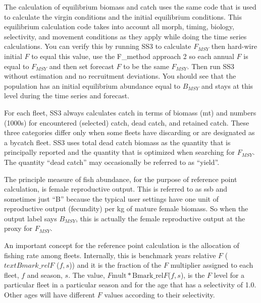 The calculation of equilibrium biomass and catch uses the same code that is used to calculate the virgin conditions and the initial equilibrium conditions. This equilibrium calculation code takes into account all morph, timing, biology, selectivity, and movement conditions as they apply while doing the time series calculations. You can verify this by running SS3 to calculate $F_{MSY}$ then hard-wire initial $F$ to equal this value, use the F\_method approach 2 so each annual $F$ is equal to $F_{MSY}$ and then set forecast $F$ to be the same $F_{MSY}$. Then run SS3 without estimation and no recruitment deviations. You should see that the population has an initial equilibrium abundance equal to $B_{MSY}$ and stays at this level during the time series and forecast.

For each fleet, SS3 always calculates catch in terms of biomass (mt) and numbers (1000s) for encountered (selected) catch, dead catch, and retained catch. These three categories differ only when some fleets have discarding or are designated as a bycatch fleet. SS3 uses total dead catch biomass as the quantity that is principally reported and the quantity that is optimized when searching for $F_{MSY}$. The quantity ``dead catch'' may occasionally be referred to as ``yield''.

The principle measure of fish abundance, for the purpose of reference point calculation, is female reproductive output. This is referred to as \gls{ssb} and sometimes just ``B'' because the typical user settings have one unit of reproductive output (fecundity) per kg of mature female biomass. So when the output label says $B_{MSY}$, this is actually the female reproductive output at the proxy for $F_{MSY}$.

An important concept for the reference point calculation is the allocation of fishing rate among fleets. Internally, this is benchmark years relative $F$ ($text{Bmark\_rel}F$ ($f,s$)) and it is the fraction of the $F$ multiplier assigned to each fleet, $f$ and season, $s$. The value, $F\text{mult} * \text{Bmark\_rel}F$($f,s$), is the $F$ level for a particular fleet in a particular season and for the age that has a selectivity of 1.0. Other ages will have different $F$ values according to their selectivity.

